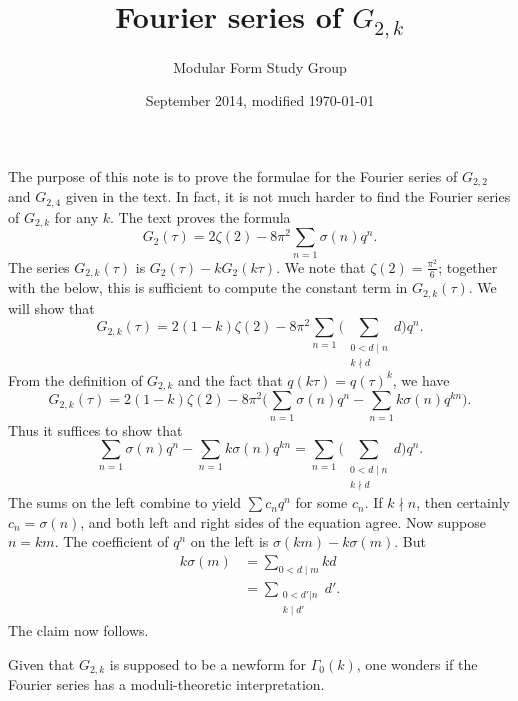 \documentclass {amsart}
\theoremstyle{plain}
\theoremstyle{definition}
\theoremstyle{remark}
\newcommand{\gtk}{G_{2,k}}
\begin{document}
 

\title{Fourier series of $G_{2,k}$}

\author{Modular Form Study Group}

\date{September 2014, modified \today}

\maketitle


The purpose of this note is to prove the formulae for the Fourier series of $G_{2,2}$ and $G_{2,4}$ given in the text. In fact, it is not much harder to find the Fourier series of $G_{2,k}$ for any $k$. The text proves the formula
\[
G_2(\tau) = 2\zeta(2)  - 8\pi^2 \sum_{n=1} \sigma(n) q^n.
\]
The series $G_{2,k}(\tau)$ is $G_2(\tau) - k G_2(k\tau)$. We note that $\zeta(2) = \frac{\pi^2}{6}$; together with the below, this is sufficient to compute the constant term in $G_{2,k}(\tau)$. We will show that
\[
G_{2,k}(\tau) = 2(1-k)\zeta(2) - 8\pi^2 \sum_{n=1} \bigg(\sum_{\substack{0 < d \mid n \\ k \nmid d}} d\bigg) q^n.
\]
From the definition of $\gtk$ and the fact that $q(k\tau) = q(\tau)^k$, we have
\[
\gtk(\tau) = 2(1-k)\zeta(2) - 8\pi^2 \bigg(\sum_{n=1} \sigma(n) q^n - \sum_{n=1} k\sigma(n) q^{kn}\bigg).
\]
Thus it suffices to show that
\[
\sum_{n=1} \sigma(n) q^n - \sum_{n=1} k\sigma(n) q^{kn} = \sum_{n=1} \bigg(\sum_{\substack{0 < d \mid n \\ k \nmid d}} d\bigg) q^n.
\]
The sums on the left combine to yield $\sum c_n q^n$ for some $c_n$. If $k \nmid n$, then certainly $c_n = \sigma(n)$, and both left and right sides of the equation agree. Now suppose $n = km$. The coefficient of $q^n$ on the left is $\sigma(km) - k\sigma(m)$. But
\begin{align*}
  k \sigma(m) &= \sum_{0 < d \mid m} kd \\
  &= \sum_{\substack{0< d' | n \\ k \mid d'}} d'.
\end{align*}
The claim now follows.

Given that $\gtk$ is supposed to be a newform for $\Gamma_0(k)$, one wonders if the Fourier series has a moduli-theoretic interpretation.
\end{document}
